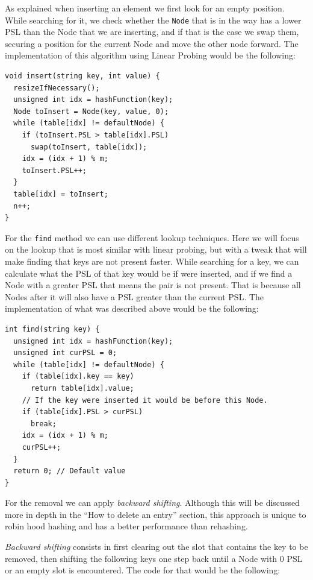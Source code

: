 As explained when inserting an element we first look for an empty position. While searching for it, we check whether the \texttt{Node} that is in the way has a lower PSL than the Node that we are inserting, and if that is the case we swap them, securing a position for the current Node and move the other node forward. The implementation of this algorithm using Linear Probing would be the following:

\newpage

\begin{lstlisting}
void insert(string key, int value) {
  resizeIfNecessary();
  unsigned int idx = hashFunction(key);
  Node toInsert = Node(key, value, 0);
  while (table[idx] != defaultNode) {
    if (toInsert.PSL > table[idx].PSL)
      swap(toInsert, table[idx]);         
    idx = (idx + 1) % m;
    toInsert.PSL++;
  }
  table[idx] = toInsert;
  n++;
}
\end{lstlisting}

For the \texttt{find} method we can use different lookup techniques. Here we will focus on the lookup that is most similar with linear probing, but with a tweak that will make finding that keys are not present faster. While searching for a key, we can calculate what the PSL of that key would be if were inserted, and if we find a Node with a greater PSL that means the pair is not present. That is because all Nodes after it will also have a PSL greater than the current PSL. The implementation of what was described above would be the following:

\begin{lstlisting}
int find(string key) {
  unsigned int idx = hashFunction(key);
  unsigned int curPSL = 0;
  while (table[idx] != defaultNode) {
    if (table[idx].key == key) 
      return table[idx].value;
    // If the key were inserted it would be before this Node.
    if (table[idx].PSL > curPSL)
      break; 
    idx = (idx + 1) % m;
    curPSL++;
  }
  return 0; // Default value
}
\end{lstlisting}

For the removal we can apply \textit{backward shifting}. Although this will be discussed more in depth in the ``How to delete an entry'' section, this approach is unique to robin hood hashing and has a better performance than rehashing.

\textit{Backward shifting} consists in first clearing out the slot that contains the key to be removed, then shifting the following keys one step back until a Node with 0 PSL or an empty slot is encountered. The code for that would be the following:

